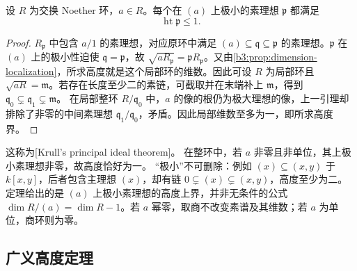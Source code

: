 \begin{theorem}\label{b3:thm:principal-ideal-theorem}
	设 \(R\) 为交换 Noether 环，\(a\in R\)。每个在 \((a)\) 上极小的素理想 \(\mathfrak p\) 都满足
	\[
		\operatorname{ht}\mathfrak p\le1.
	\]
\end{theorem}
\begin{proof}
	\(R_{\mathfrak p}\) 中包含 \(a/1\) 的素理想，对应原环中满足 \((a)\subseteq\mathfrak q\subseteq\mathfrak p\) 的素理想。\(\mathfrak p\) 在 \((a)\) 上的极小性迫使 \(\mathfrak q=\mathfrak p\)，故 \(\sqrt{aR_{\mathfrak p}}=\mathfrak pR_{\mathfrak p}\)。又由\cref{b3:prop:dimension-localization}，所求高度就是这个局部环的维数。因此可设 \(R\) 为局部环且 \(\sqrt{aR}=\mathfrak m\)。若存在长度至少二的素链，可截取并在末端补上 \(\mathfrak m\)，得到 \(\mathfrak q_0\subsetneq\mathfrak q_1\subsetneq\mathfrak m\)。 在局部整环 \(R/\mathfrak q_0\) 中，\(a\) 的像的根仍为极大理想的像，上一引理却排除了非零的中间素理想 \(\mathfrak q_1/\mathfrak q_0\)，矛盾。因此局部维数至多为一，即所求高度界。
\end{proof}

这称为[Krull's principal ideal theorem]。 在整环中，若 \(a\) 非零且非单位，其上极小素理想非零，故高度恰好为一。 “极小”不可删除：例如 \((x)\subseteq(x,y)\) 于 \(k[x,y]\)，后者包含主理想 \((x)\)，却有链 \(0\subsetneq(x)\subsetneq(x,y)\)，高度至少为二。 定理给出的是 \((a)\) 上极小素理想的高度上界，并非无条件的公式 \(\dim R/(a)=\dim R-1\)。若 \(a\) 幂零，取商不改变素谱及其维数；若 \(a\) 为单位，商环则为零。

\subsection{广义高度定理}
\label{b3:subsec:0902:02}

